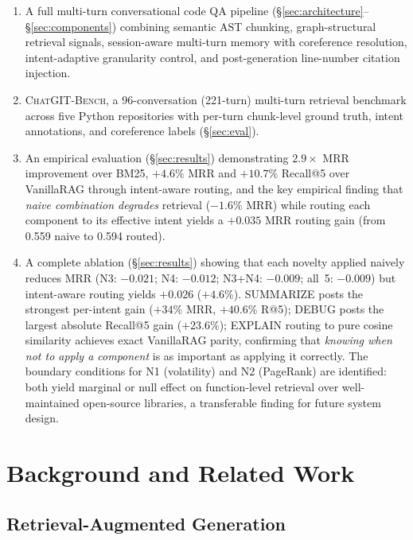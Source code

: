 \documentclass[runningheads]{llncs}
\newcommand{\conv}{\textsc{ChatGIT-Bench}\xspace}
\begin{document}
\begin{enumerate}[label=(\arabic*),leftmargin=*]
  \item A full multi-turn conversational code QA pipeline
        (\S\ref{sec:architecture}--\S\ref{sec:components})
        combining semantic AST chunking, graph-structural retrieval
        signals, session-aware multi-turn memory with coreference
        resolution, intent-adaptive granularity control, and
        post-generation line-number citation injection.
  \item \conv, a 96-conversation (221-turn) multi-turn retrieval
        benchmark across five Python repositories with per-turn
        chunk-level ground truth, intent annotations, and
        coreference labels (\S\ref{sec:eval}).
  \item An empirical evaluation (\S\ref{sec:results}) demonstrating
        $2.9\times$ MRR improvement over BM25, $+4.6\%$ MRR and
        $+10.7\%$ Recall@5 over VanillaRAG through intent-aware
        routing, and the key empirical finding that \emph{naive
        combination degrades} retrieval ($-1.6\%$ MRR) while routing
        each component to its effective intent yields a $+0.035$ MRR
        routing gain (from 0.559 naive to 0.594 routed).
  \item A complete ablation (\S\ref{sec:results}) showing that each
        novelty applied naively reduces MRR (N3: $-0.021$; N4: $-0.012$;
        N3+N4: $-0.009$; all~5: $-0.009$) but intent-aware routing
        yields $+0.026$ ($+4.6\%$). SUMMARIZE posts the strongest
        per-intent gain ($+34\%$ MRR, $+40.6\%$ R@5);
        DEBUG posts the largest absolute Recall@5 gain ($+23.6\%$);
        EXPLAIN routing to pure cosine similarity achieves exact
        VanillaRAG parity, confirming that \emph{knowing when not to
        apply a component} is as important as applying it correctly.
        The boundary conditions for N1 (volatility) and N2 (PageRank)
        are identified: both yield marginal or null effect on
        function-level retrieval over well-maintained open-source
        libraries, a transferable finding for future system design.
\end{enumerate}

\section{Background and Related Work}
\label{sec:related}

\subsection{Retrieval-Augmented Generation}
\end{document}
